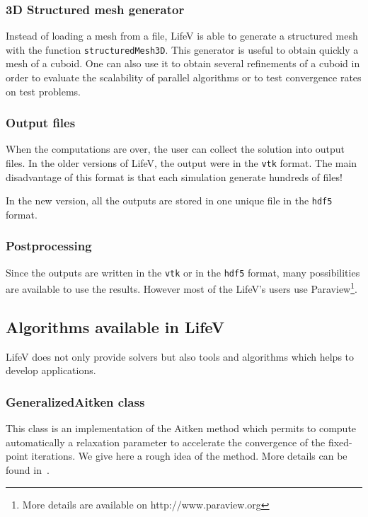 \documentclass[11pt]{article}
\begin{document}
\subsubsection{3D Structured mesh generator}
Instead of loading a mesh from a file, LifeV is able to generate a structured mesh with the function \texttt{structuredMesh3D}. This generator is useful to obtain quickly a mesh of a cuboid. One can also use it to obtain several refinements of a cuboid in order to evaluate the scalability of parallel algorithms or to test convergence rates on test problems.

\subsubsection{Output files}
When the computations are over, the user can collect the solution into output files. In the older versions of LifeV, the output were in the \texttt{vtk} format. The main disadvantage of this format is that each simulation generate hundreds of files!

In the new version, all the outputs are stored in one unique file in the \texttt{hdf5} format.

\subsubsection{Postprocessing}
Since the outputs are written in the \texttt{vtk} or in the \texttt{hdf5} format, many possibilities are available to use the results. However most of the LifeV's users use Paraview\footnote{More details are available on http://www.paraview.org}.

\subsection{Algorithms available in LifeV}
LifeV does not only provide solvers but also tools and algorithms which helps to develop applications.

\subsubsection{GeneralizedAitken class}
\label{sec:aitken}
This class is an implementation of the Aitken method which permits to compute automatically a relaxation parameter to accelerate the convergence of the fixed-point iterations. We give here a rough idea of the method. More details can be found in~\cite{deparis}.
\end{document}
